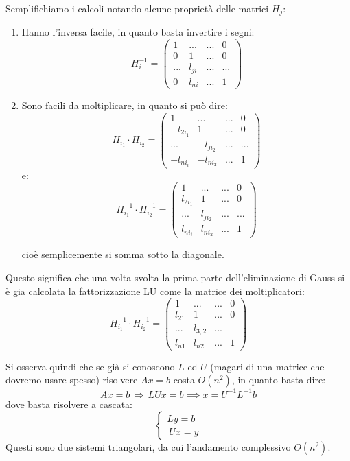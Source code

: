 \documentclass[a4paper,11pt]{article}
\begin{document}
Semplifichiamo i calcoli notando alcune proprietà delle matrici $H_j$:
\begin{enumerate}
	\item Hanno l'inversa facile, in quanto basta invertire i segni:
	$$
	H_i^{-1} = \begin{pmatrix}
		1 & ... & ... & 0 \\
		0 & 1 & ... & 0 \\
		... & l_{ji} & ... & ... \\
		0 & l_{ni} & ... & 1
	\end{pmatrix}
	$$

	\item Sono facili da moltiplicare, in quanto si può dire:
	$$
		H_{i_1} \cdot H_{i_2} = \begin{pmatrix}
		1 & ... & ... & 0 \\
		-l_{2i_1} & 1 & ... & 0 \\
		... & -l_{ji_2} & ... & ... \\
		-l_{ni_i} & -l_{ni_2} & ... & 1
	\end{pmatrix}
	$$
	e:	
	$$
	H_{i_1}^{-1} \cdot H_{i_2}^{-1} = \begin{pmatrix}
		1 & ... & ... & 0 \\
		l_{2i_1} & 1 & ... & 0 \\
		... & l_{ji_2} & ... & ... \\
		l_{ni_i} & l_{ni_2} & ... & 1
	\end{pmatrix}
	$$

	cioè semplicemente si somma sotto la diagonale.
\end{enumerate}

Questo significa che una volta svolta la prima parte dell'eliminazione di Gauss si è gia calcolata la fattorizzazione LU come la matrice dei moltiplicatori:
$$
H_{i_1}^{-1} \cdot H_{i_2}^{-1} = \begin{pmatrix}
	1 & ... & ... & 0 \\
	l_{21} & 1 & ... & 0 \\
	... & l_{3,2} & ...\\
	l_{n1} & l_{n2} & ... & 1
\end{pmatrix}
$$

Si osserva quindi che se già si conoscono $L$ ed $U$ (magari di una matrice che dovremo usare spesso) risolvere $Ax = b$ costa $O(n^2)$, in quanto basta dire:
$$
Ax = b \, \Rightarrow \, LUx = b \implies x = U^{-1} L^{-1} b
$$
dove basta risolvere a cascata:
\[
	\begin{cases}
		Ly = b \\\
		Ux = y
	\end{cases}
\]
Questi sono due sistemi triangolari, da cui l'andamento complessivo $O(n^2)$.
\end{document}
